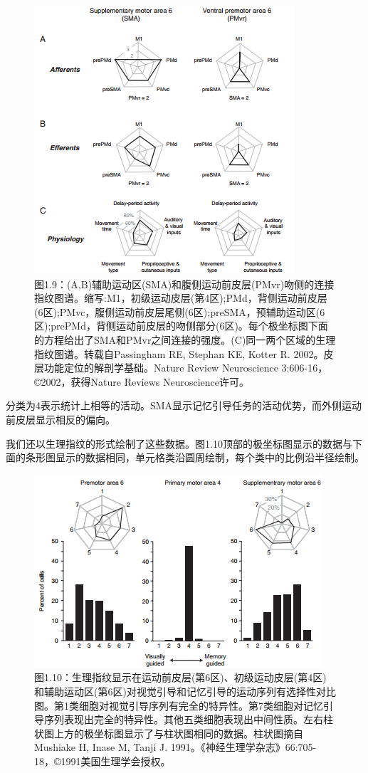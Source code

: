 \begin{figure}[!htb]
	\centering
	\includegraphics[width=0.8\linewidth]{image_pfc/Fig_1_9}
	\caption*{图1.9：(A,B)辅助运动区(SMA)和腹侧运动前皮层(PMvr)吻侧的连接指纹图谱。缩写:M1，初级运动皮层(第4区);PMd，背侧运动前皮层(6区);PMvc，腹侧运动前皮层尾侧(6区);preSMA，预辅助运动区(6区);prePMd，背侧运动前皮层的吻侧部分(6区)。每个极坐标图下面的方程给出了SMA和PMvr之间连接的强度。(C)同一两个区域的生理指纹图谱。转载自Passingham RE, Stephan KE, Kotter R. 2002。皮层功能定位的解剖学基础。Nature Review Neuroscience 3:606-16，©2002，获得Nature Reviews Neuroscience许可。	}
\end{figure}


\par
分类为4表示统计上相等的活动。SMA显示记忆引导任务的活动优势，而外侧运动前皮层显示相反的偏向。
\par
我们还以生理指纹的形式绘制了这些数据。图1.10顶部的极坐标图显示的数据与下面的条形图显示的数据相同，单元格类沿圆周绘制，每个类中的比例沿半径绘制。

\begin{figure}[!htb]
	\centering
	\includegraphics[width=0.8\linewidth]{image_pfc/Fig_1_10}
	\caption*{图1.10：生理指纹显示在运动前皮层(第6区)、初级运动皮层(第4区)和辅助运动区(第6区)对视觉引导和记忆引导的运动序列有选择性对比图。第1类细胞对视觉引导序列有完全的特异性。第7类细胞对记忆引导序列表现出完全的特异性。其他五类细胞表现出中间性质。左右柱状图上方的极坐标图显示了与柱状图相同的数据。柱状图摘自Mushiake H, Inase M, Tanji J. 1991。《神经生理学杂志》66:705-18，©1991美国生理学会授权。	}
\end{figure}


